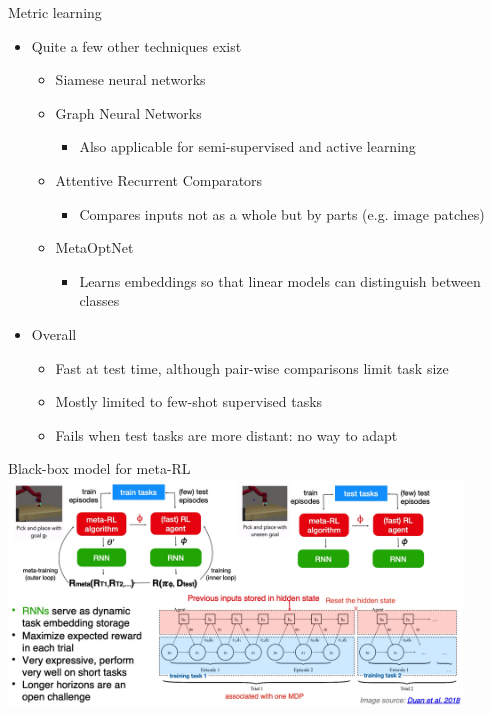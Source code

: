 \begin{frame}{Metric learning}
    \begin{itemize}
        \item Quite a few other techniques exist
        \begin{itemize}
            \item Siamese neural networks 
            \item Graph Neural Networks 
            \begin{itemize}
                \item Also applicable for semi-supervised and active learning
            \end{itemize}
            \item Attentive Recurrent Comparators 
            \begin{itemize}
                \item Compares inputs not as a whole but by parts (e.g. image patches)
            \end{itemize}
            \item MetaOptNet
            \begin{itemize}
                \item Learns embeddings so that linear models can distinguish between classes
            \end{itemize}
        \end{itemize}
        \item Overall
        \begin{itemize}
            \item Fast at test time, although pair-wise comparisons limit task size
            \item Mostly limited to few-shot supervised tasks
            \item Fails when test tasks are more distant: no way to adapt
        \end{itemize}
    \end{itemize}
\end{frame}
\begin{frame}{Black-box model for meta-RL}
    \centering\includegraphics[height=6cm]{image/img013804.jpg}
\end{frame}
